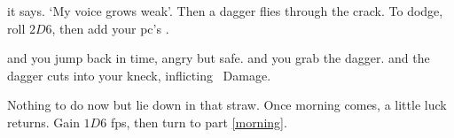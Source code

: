 it says.
`My voice grows weak'.
Then a dagger flies through the crack.
To dodge, roll $2D6$, then add your \gls{pc}'s .

\begin{selectPath}
  {and you jump back in time, angry but safe.}%
  {}
  {and you grab the dagger.}%
  {}
  {and the dagger cuts into your kneck, inflicting ~Damage.}%
  {}
\end{selectPath}

Nothing to do now but lie down in that straw.
Once morning comes, a little luck returns.
Gain $1D6$ \glspl{fp}, then turn to part \vref{morning}.
